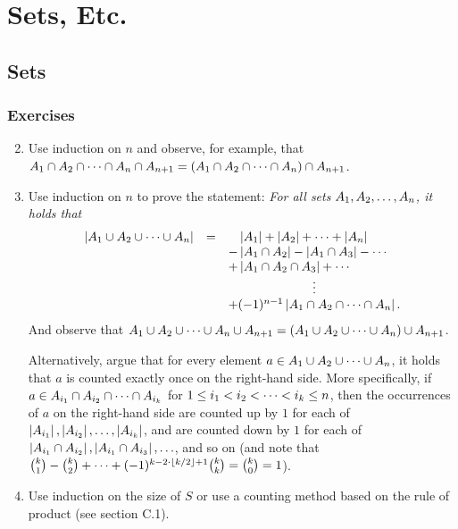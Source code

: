 \setcounter{chapter}{1}
\chapter{Sets, Etc.}
\section{Sets}
\subsection*{Exercises}
\begin{enumerate}[\thesection-1]
%
\setcounter{enumi}{1}
%
\item Use induction on $n$ and observe, for example, that $A_1 \cap A_2 \cap \cdots \cap A_n \cap A_{n + 1} = (A_1 \cap A_2 \cap \cdots \cap A_n) \cap A_{n + 1}$.
%
\item Use induction on $n$ to prove the statement: \emph{For all sets $A_1, A_2, \ldots, A_n$, it holds that
\[
\begin{array}{lll}
\card{A_1 \union A_2 \union \etc \union A_n} & = & \phantom{+} \card{A_1} + \card{A_2} + \etc + \card{A_n} \cr
 & & - \card{A_1 \intsc A_2} - \card{A_1 \intsc A_3} - \etc \cr
 & & + \card{A_1 \intsc A_2 \intsc A_3} + \etc \cr
 & & \multicolumn{1}{c}{\etv} \cr
 & & + (-1)^{n - 1} \card{A_1 \intsc A_2 \intsc \etc \intsc A_n}. \cr
\end{array}
\]}And observe that $A_1 \cup A_2 \cup \cdots \cup A_n \cup A_{n + 1} = (A_1 \cup A_2 \cup \cdots \cup A_n) \cup A_{n + 1}$.

Alternatively, argue that for every element $a \in A_1 \cup A_2 \cup \cdots \cup A_n$, it holds that $a$ is counted exactly once on the right-hand side. More specifically, if $a \in A_{i_1} \cap A_{i_2} \cap \cdots \cap A_{i_k}$ for $1 \leq i_1 < i_2 < \cdots < i_k \leq n$, then the occurrences of $a$ on the right-hand side are counted up by $1$ for each of $\left|A_{i_1}\right|, \left|A_{i_2}\right|, \ldots, \left|A_{i_k}\right|$, and are counted down by $1$ for each of $\left|A_{i_1} \cap A_{i_2}\right|, \left|A_{i_1} \cap A_{i_3}\right|, \ldots$, and so on (and note that ${k \choose 1} - {k \choose 2} + \cdots + (-1)^{k - 2 \cdot \left\lfloor k / 2\right\rfloor + 1} {k \choose k} = {k \choose 0} = 1$).
%
\setcounter{enumi}{4}
%
\item Use induction on the size of $S$ or use a counting method based on the rule of product (see section C.1).
%
\end{enumerate}

